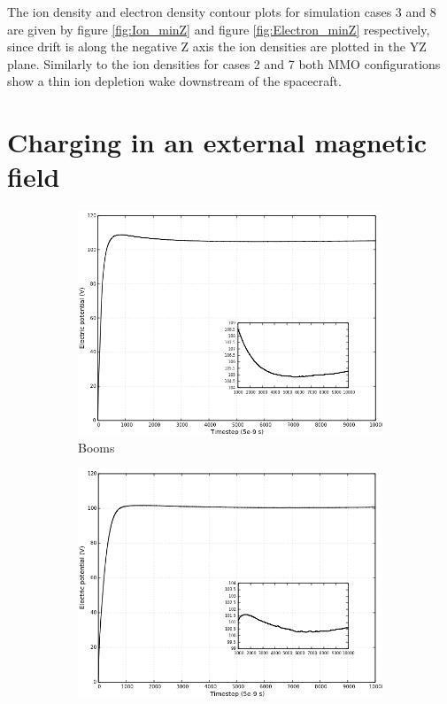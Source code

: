 The ion density and electron density contour plots for simulation cases 3 and 8 are given by figure \ref{fig:Ion_minZ} and figure \ref{fig:Electron_minZ} respectively, since drift is along the negative Z axis the ion densities are plotted in the YZ plane. Similarly to the ion densities for cases 2 and 7 both MMO configurations show a thin ion depletion wake downstream of the spacecraft.


\section{Charging in an external magnetic field}

\begin{figure}[H]
  \begin{subfigure}[b]{0.75\textwidth}
  \includegraphics[width=\columnwidth]{figures/MMO/BField/WB/C_BField_WB.png}
  \caption{Booms}
  \label{fig:C_BField_WB}
\end{subfigure}
\par\bigskip
\begin{subfigure}[b]{0.75\textwidth}
  \includegraphics[width=\columnwidth]{figures/MMO/BField/NB/C_BField_NB.png}

\end{subfigure}
\end{figure}
